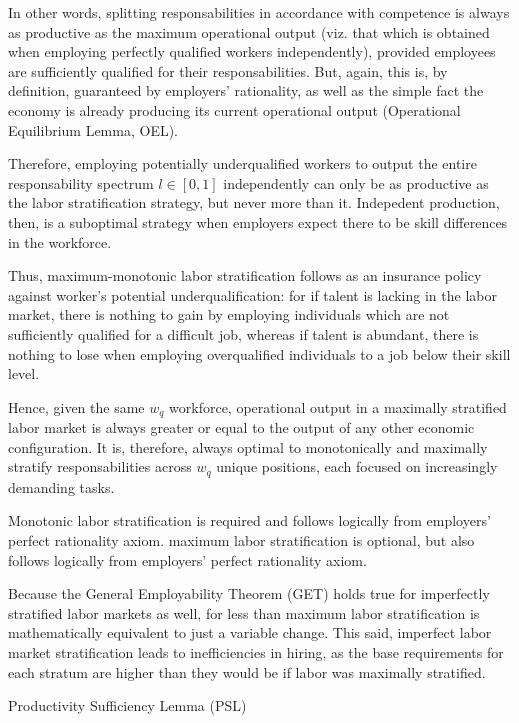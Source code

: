 \documentclass[hidelinks, nonatbib]{elsarticle}
\begin{document}
        In other words, splitting responsabilities in accordance with competence is always as productive as the maximum operational output (viz. that which is obtained when employing perfectly qualified workers independently), provided employees are sufficiently qualified for their responsabilities. But, again, this is, by definition, guaranteed by employers' rationality, as well as the simple fact the economy is already producing its current operational output (Operational Equilibrium Lemma, OEL). 
        
        Therefore, employing potentially underqualified workers to output the entire responsability spectrum $l \in [0,1]$ independently can only be as productive as the labor stratification strategy, but never more than it. Indepedent production, then, is a suboptimal strategy when employers expect there to be skill differences in the workforce.
        
        Thus, maximum-monotonic labor stratification follows as an insurance policy against worker's potential underqualification: for if talent is lacking in the labor market, there is nothing to gain by employing individuals which are not sufficiently qualified for a difficult job, whereas if talent is abundant, there is nothing to lose when employing overqualified individuals to a job below their skill level.

        Hence, given the same $w_q$ workforce, operational output in a maximally stratified labor market is always greater or equal to the output of any other economic configuration. It is, therefore, always optimal to monotonically and maximally stratify responsabilities across $w_q$ unique positions, each focused on increasingly demanding tasks.
    
    Monotonic labor stratification is required and follows logically from employers' perfect rationality axiom.
    maximum labor stratification is optional, but also follows logically from employers' perfect rationality axiom.
    
        Because the General Employability Theorem (GET) holds true for imperfectly stratified labor markets as well, for less than maximum labor stratification is mathematically equivalent to just a variable change. This said, imperfect labor market stratification leads to inefficiencies in hiring, as the base requirements for each stratum are higher than they would be if labor was maximally stratified.
    


Productivity Sufficiency Lemma (PSL)
\end{document}
